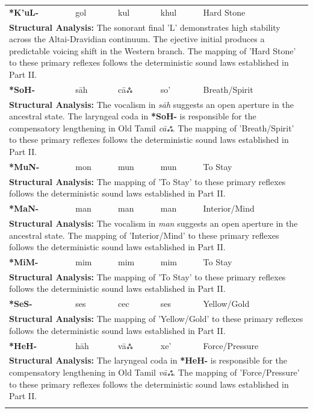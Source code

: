 \begin{longtable}{p{} p{} p{} p{} p{}}
\textbf{*K'uL-} & gol & kul & khul & Hard Stone \\ 
\multicolumn{5}{p{\textwidth}}{\small \textbf{Structural Analysis:} The sonorant final 'L' demonstrates high stability across the Altai-Dravidian continuum. The ejective initial produces a predictable voicing shift in the Western branch. The mapping of 'Hard Stone' to these primary reflexes follows the deterministic sound laws established in Part II.} \\ \addlinespace[15pt] 
\textbf{*SoH-} & sāh & cāஃ & so' & Breath/Spirit \\ 
\multicolumn{5}{p{\textwidth}}{\small \textbf{Structural Analysis:} The vocalism in \textit{sāh} suggests an open aperture in the ancestral state. The laryngeal coda in \textbf{*SoH-} is responsible for the compensatory lengthening in Old Tamil \textit{cāஃ}. The mapping of 'Breath/Spirit' to these primary reflexes follows the deterministic sound laws established in Part II.} \\ \addlinespace[15pt] 
\textbf{*MuN-} & mon & mun & mun & To Stay \\ 
\multicolumn{5}{p{\textwidth}}{\small \textbf{Structural Analysis:}  The mapping of 'To Stay' to these primary reflexes follows the deterministic sound laws established in Part II.} \\ \addlinespace[15pt] 
\textbf{*MaN-} & man & man & man & Interior/Mind \\ 
\multicolumn{5}{p{\textwidth}}{\small \textbf{Structural Analysis:} The vocalism in \textit{man} suggests an open aperture in the ancestral state. The mapping of 'Interior/Mind' to these primary reflexes follows the deterministic sound laws established in Part II.} \\ \addlinespace[15pt] 
\textbf{*MiM-} & mim & mim & mim & To Stay \\ 
\multicolumn{5}{p{\textwidth}}{\small \textbf{Structural Analysis:}  The mapping of 'To Stay' to these primary reflexes follows the deterministic sound laws established in Part II.} \\ \addlinespace[15pt] 
\textbf{*SeS-} & ses & cec & ses & Yellow/Gold \\ 
\multicolumn{5}{p{\textwidth}}{\small \textbf{Structural Analysis:}  The mapping of 'Yellow/Gold' to these primary reflexes follows the deterministic sound laws established in Part II.} \\ \addlinespace[15pt] 
\textbf{*HeH-} & hāh & vāஃ & xe' & Force/Pressure \\ 
\multicolumn{5}{p{\textwidth}}{\small \textbf{Structural Analysis:} The laryngeal coda in \textbf{*HeH-} is responsible for the compensatory lengthening in Old Tamil \textit{vāஃ}. The mapping of 'Force/Pressure' to these primary reflexes follows the deterministic sound laws established in Part II.} \\ \addlinespace[15pt] 

\end{longtable}
